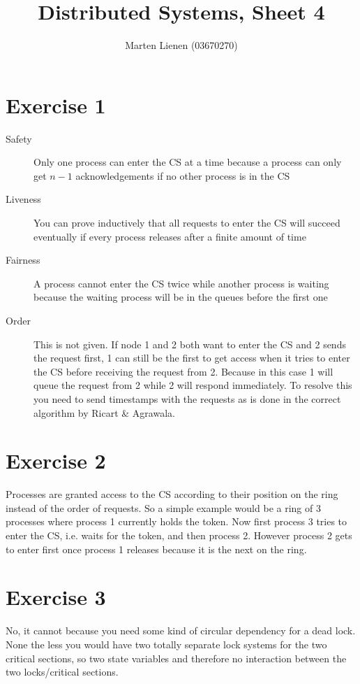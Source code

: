 \documentclass[10pt,a4paper]{article}
\title{Distributed Systems, Sheet 4}
\author{Marten Lienen (03670270)}
\begin{document}
\maketitle

\section*{Exercise 1}

\begin{description}
\item[Safety] Only one process can enter the CS at a time because a process can only get $n - 1$ acknowledgements if no other process is in the CS
\item[Liveness] You can prove inductively that all requests to enter the CS will succeed eventually if every process releases after a finite amount of time
\item[Fairness] A process cannot enter the CS twice while another process is waiting because the waiting process will be in the queues before the first one
\item[Order] This is not given.
  If node 1 and 2 both want to enter the CS and 2 sends the request first, 1 can still be the first to get access when it tries to enter the CS before receiving the request from 2.
  Because in this case 1 will queue the request from 2 while 2 will respond immediately.
  To resolve this you need to send timestamps with the requests as is done in the correct algorithm by Ricart \& Agrawala.
\end{description}

\section*{Exercise 2}

Processes are granted access to the CS according to their position on the ring instead of the order of requests.
So a simple example would be a ring of 3 processes where process 1 currently holds the token.
Now first process 3 tries to enter the CS, i.e. waits for the token, and then process 2.
However process 2 gets to enter first once process 1 releases because it is the next on the ring.

\section*{Exercise 3}

No, it cannot because you need some kind of circular dependency for a dead lock.
None the less you would have two totally separate lock systems for the two critical sections, so two state variables and therefore no interaction between the two locks/critical sections.
\end{document}
